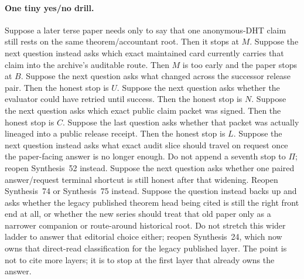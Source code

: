 \documentclass[11pt]{article}
\begin{document}
\paragraph{One tiny yes/no drill.}
Suppose a later terse paper needs only to say that one anonymous-DHT claim still rests on the same theorem/accountant root. Then it stops at $M$.
Suppose the next question instead asks which exact maintained card currently carries that claim into the archive's auditable route. Then $M$ is too early and the paper stops at $B$.
Suppose the next question asks what changed across the successor release pair. Then the honest stop is $U$.
Suppose the next question asks whether the evaluator could have retried until success. Then the honest stop is $N$.
Suppose the next question asks which exact public claim packet was signed. Then the honest stop is $C$.
Suppose the last question asks whether that packet was actually lineaged into a public release receipt. Then the honest stop is $L$. Suppose the next question instead asks what exact audit slice should travel on request once the paper-facing answer is no longer enough. Do not append a seventh stop to $\Pi$; reopen Synthesis~52 instead. Suppose the next question asks whether one paired answer/request terminal shortcut is still honest after that widening. Reopen Synthesis~74 or Synthesis~75 instead. Suppose the question instead backs up and asks whether the legacy published theorem head being cited is still the right front end at all, or whether the new series should treat that old paper only as a narrower companion or route-around historical root. Do not stretch this wider ladder to answer that editorial choice either; reopen Synthesis~24, which now owns that direct-read classification for the legacy published layer. The point is not to cite more layers; it is to stop at the first layer that already owns the answer.
\end{document}
